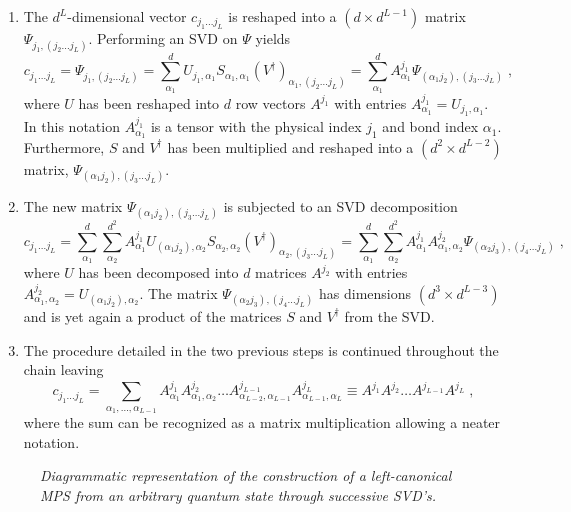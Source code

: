 \begin{enumerate}
\item
The $d^L$-dimensional vector $c_{j_1 \ldots j_L}$ is reshaped into a $(d \times d^{L-1})$ matrix $\Psi_{j_1 , (j_2 \ldots j_L)}$. Performing an SVD on $\Psi$ yields
\begin{equation}
	c_{j_1 \ldots j_L} = \Psi_{j_1 , (j_2 \ldots j_L)} = \sum_{\alpha_1}^{d} U_{j_1 , \alpha_1} S_{\alpha_1 , \alpha_1} (V^{\dag})_{\alpha_1 , (j_2 \ldots j_L)} = \sum_{\alpha_1}^{d} A_{\alpha_1}^{j_1} \Psi_{(\alpha_1 j_2),(j_3 \ldots j_L)} \; ,
\end{equation}
where $U$ has been reshaped into $d$ row vectors $A^{j_1}$ with entries $A_{\alpha_1}^{j_1} = U_{j_1 , \alpha_1}$. In this notation $A_{\alpha_1}^{j_1}$ is a tensor with the physical index $j_1$ and bond index $\alpha_1$. Furthermore, $S$ and $V^{\dag}$ has been multiplied and reshaped into a $(d^2 \times d^{L-2})$ matrix, $\Psi_{(\alpha_1 j_2),(j_3 \ldots j_L)}$.

\item
The new matrix $\Psi_{(\alpha_1 j_2),(j_3 \ldots j_L)}$ is subjected to an SVD decomposition
\begin{equation}
	c_{j_1 \ldots j_L} = \sum_{\alpha_1}^{d} \sum_{\alpha_2}^{d^2} A_{\alpha_1}^{j_1} U_{(\alpha_1 j_2) , \alpha_2} S_{\alpha_2 , \alpha_2} (V^{\dag})_{\alpha_2 , (j_3 \ldots j_L)} = \sum_{\alpha_1}^{d} \sum_{\alpha_2}^{d^2} A_{\alpha_1}^{j_1} A_{\alpha_1 , \alpha_2}^{j_2} \Psi_{(\alpha_2 j_3),(j_4 \ldots j_L)} \; ,
\end{equation}
where $U$ has been decomposed into $d$ matrices $A^{j_2}$ with entries $A_{\alpha_1 , \alpha_2}^{j_2} = U_{(\alpha_1 j_2) , \alpha_2}$. The matrix $\Psi_{(\alpha_2 j_3),(j_4 \ldots j_L)}$ has dimensions $(d^3 \times d^{L-3})$ and is yet again a product of the matrices $S$ and $V^{\dag}$ from the SVD.

\item
The procedure detailed in the two previous steps is continued throughout the chain leaving 
\begin{equation}
	c_{j_1 \ldots j_L} = \sum_{\alpha_1 , \ldots , \alpha_{L-1}} A_{\alpha_1}^{j_1} A_{\alpha_1 , \alpha_2}^{j_2} \ldots A_{\alpha_{L-2} ,\alpha_{L-1}}^{j_{L-1}} A_{\alpha_{L-1} ,\alpha_{L}}^{j_{L}} \equiv A^{j_1} A^{j_2} \ldots A^{j_{L-1}} A^{j_{L}} \; ,
\end{equation}
where the sum can be recognized as a matrix multiplication allowing a neater notation.
\end{enumerate}
\begin{figure}[h!]
	\centering
	
	\caption{\textit{Diagrammatic representation of the construction of a left-canonical MPS from an arbitrary quantum state through successive SVD's.}}
	\label{fig:MPSbuild}
\end{figure}
